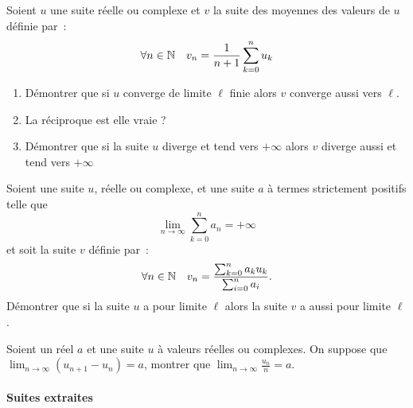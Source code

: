 \begin{exercice}
    Soient \(u\) une suite réelle ou complexe et \(v\) la suite des moyennes des valeurs de \(u\) définie par~:
    \[ \forall n \in \mathbb{N} \quad v_n = \frac{1}{n+1}\sum_{k=0}^n u_k \]
    \begin{enumerate}
        \item Démontrer que si \(u\) converge de limite \(\ell\) finie alors \(v\) converge aussi vers \(\ell\).
        \item La réciproque est elle vraie ?
        \item Démontrer que si la suite \(u\) diverge et tend vers \(+\infty\) alors \(v\) diverge aussi et tend vers \(+\infty\)
    \end{enumerate}    
\end{exercice}
\begin{exercice}
    Soient une suite \(u\), réelle ou complexe, et une suite \(a\) à termes strictement positifs telle que \[\lim_{n \to \infty} \sum_{k=0}^n a_n = +\infty\] et soit la suite \(v\) définie par~:
    \[\forall n \in \mathbb{N} \quad v_n = \frac{\sum_{k=0}^n a_k u_k}{\sum_{i=0}^n a_i}.\]
    Démontrer que si la suite \(u\) a pour limite \(\ell\) alors la suite \(v\) a aussi pour limite \(\ell\).
\end{exercice}
\begin{exercice}
    Soient un réel \(a\) et une suite \(u\) à valeurs réelles ou complexes. On suppose que \(\lim_{n\to\infty} (u_{n+1}-u_n) = a\), montrer que \(\lim_{n\to\infty} \frac{u_n}{n} = a\).
\end{exercice}
\paragraph{Suites extraites}
~~

